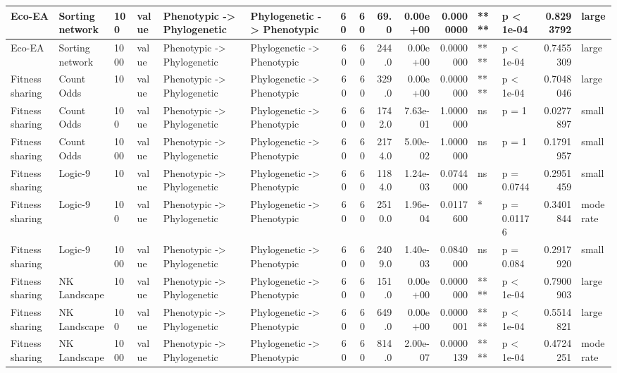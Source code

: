 \documentclass[]{book}
\begin{document}
\begin{table}
\begin{tabular}[t]{l|l|l|l|l|l|r|r|r|r|r|l|l|r|l}
\hline
Eco-EA & Sorting network & 100 & value & Phenotypic
    ->
Phylogenetic & Phylogenetic
    ->
Phenotypic & 60 & 60 & 69.0 & 0.00e+00 & 0.0000000 & **** & p < 1e-04 & 0.8293792 & large\\
\hline
Eco-EA & Sorting network & 1000 & value & Phenotypic
    ->
Phylogenetic & Phylogenetic
    ->
Phenotypic & 60 & 60 & 244.0 & 0.00e+00 & 0.0000000 & **** & p < 1e-04 & 0.7455309 & large\\
\hline
Fitness sharing & Count Odds & 10 & value & Phenotypic
    ->
Phylogenetic & Phylogenetic
    ->
Phenotypic & 60 & 60 & 329.0 & 0.00e+00 & 0.0000000 & **** & p < 1e-04 & 0.7048046 & large\\
\hline
Fitness sharing & Count Odds & 100 & value & Phenotypic
    ->
Phylogenetic & Phylogenetic
    ->
Phenotypic & 60 & 60 & 1742.0 & 7.63e-01 & 1.0000000 & ns & p = 1 & 0.0277897 & small\\
\hline
Fitness sharing & Count Odds & 1000 & value & Phenotypic
    ->
Phylogenetic & Phylogenetic
    ->
Phenotypic & 60 & 60 & 2174.0 & 5.00e-02 & 1.0000000 & ns & p = 1 & 0.1791957 & small\\
\hline
Fitness sharing & Logic-9 & 10 & value & Phenotypic
    ->
Phylogenetic & Phylogenetic
    ->
Phenotypic & 60 & 60 & 1184.0 & 1.24e-03 & 0.0744000 & ns & p = 0.0744 & 0.2951459 & small\\
\hline
Fitness sharing & Logic-9 & 100 & value & Phenotypic
    ->
Phylogenetic & Phylogenetic
    ->
Phenotypic & 60 & 60 & 2510.0 & 1.96e-04 & 0.0117600 & * & p = 0.01176 & 0.3401844 & moderate\\
\hline
Fitness sharing & Logic-9 & 1000 & value & Phenotypic
    ->
Phylogenetic & Phylogenetic
    ->
Phenotypic & 60 & 60 & 2409.0 & 1.40e-03 & 0.0840000 & ns & p = 0.084 & 0.2917920 & small\\
\hline
Fitness sharing & NK Landscape & 10 & value & Phenotypic
    ->
Phylogenetic & Phylogenetic
    ->
Phenotypic & 60 & 60 & 151.0 & 0.00e+00 & 0.0000000 & **** & p < 1e-04 & 0.7900903 & large\\
\hline
Fitness sharing & NK Landscape & 100 & value & Phenotypic
    ->
Phylogenetic & Phylogenetic
    ->
Phenotypic & 60 & 60 & 649.0 & 0.00e+00 & 0.0000001 & **** & p < 1e-04 & 0.5514821 & large\\
\hline
Fitness sharing & NK Landscape & 1000 & value & Phenotypic
    ->
Phylogenetic & Phylogenetic
    ->
Phenotypic & 60 & 60 & 814.0 & 2.00e-07 & 0.0000139 & **** & p < 1e-04 & 0.4724251 & moderate\\

\end{tabular}
\end{table}
\end{document}
